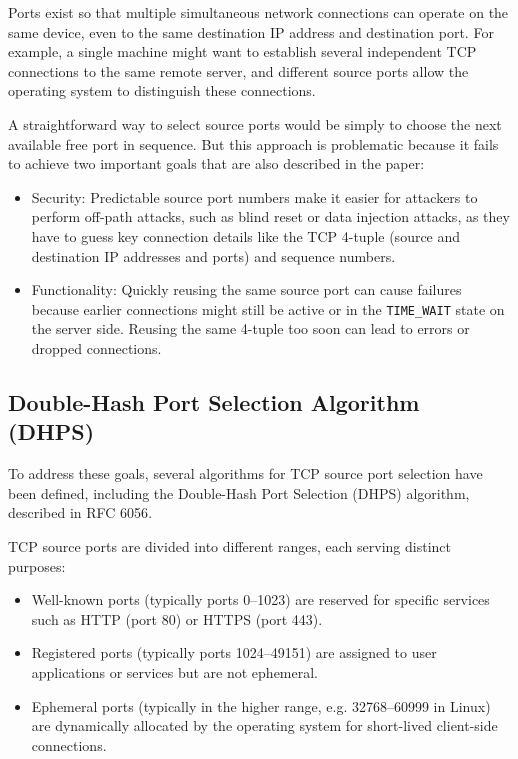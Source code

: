 \documentclass{report}
\begin{document}
\alert{Ports} exist so that multiple simultaneous network connections can operate on the same device, even to the same destination IP address and destination port. For example, a single machine might want to establish several independent TCP connections to the same remote server, and different source ports allow the operating system to distinguish these connections.  

A straightforward way to select source ports would be simply to choose the next available free port in sequence. But this approach is problematic because it fails to achieve two important goals that are also described in the paper:

\begin{itemize}
  \item \alert{Security:} Predictable source port numbers make it easier for attackers to perform off-path attacks, such as blind reset or data injection attacks, as they have to guess key connection details like the TCP 4-tuple (source and destination IP addresses and ports) and sequence numbers.
  \item \alert{Functionality:} Quickly reusing the same source port can cause failures because earlier connections might still be active or in the \texttt{TIME\_WAIT} state on the server side. Reusing the same 4-tuple too soon can lead to errors or dropped connections.
\end{itemize}

\subsection{Double-Hash Port Selection Algorithm (DHPS)}
\label{sec:double-hash port selection algorithm}

To address these goals, several algorithms for TCP source port selection have been defined, including the \alert{Double-Hash Port Selection (DHPS)} algorithm, described in RFC 6056\cite{larsenRecommendationsTransportProtocolPort2011}. %

TCP source ports are divided into different ranges, each serving distinct purposes:
\begin{itemize}
    \item \alert{Well-known ports} (typically ports 0–1023) are reserved for specific services such as HTTP (port 80) or HTTPS (port 443).
    \item \alert{Registered ports} (typically ports 1024–49151) are assigned to user applications or services but are not ephemeral.
    \item \alert{Ephemeral ports} (typically in the higher range, e.g. 32768–60999 in Linux) are dynamically allocated by the operating system for short-lived client-side connections.
\end{itemize}
\end{document}
